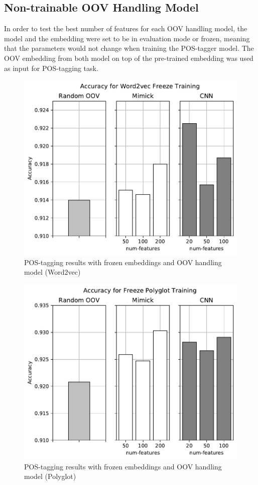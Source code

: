       \subsection{Non-trainable OOV Handling Model}
      In order to test the best number of features for each
      OOV handling model, the model and the embedding were set to be
      in evaluation mode or frozen, meaning that the parameters would
      not change when training the POS-tagger model. The OOV embedding
      from both model on top of the pre-trained embedding was used as
      input for POS-tagging task. 
      \begin{figure}[h]
        \centering
        \includegraphics[width=0.8\linewidth]{images/freeze_word2vec.pdf}
        \caption{POS-tagging results with frozen embeddings and OOV handling model (Word2vec)}
        \label{fig:postag_word2vec_freeze_results}
      \end{figure}
      \begin{figure}[h]
        \centering
        \includegraphics[width=0.8\linewidth]{images/freeze_polyglot.pdf}
        \caption{POS-tagging results with frozen embeddings and OOV handling model (Polyglot)}
        \label{fig:postag_polyglot_freeze_results}
      \end{figure}
